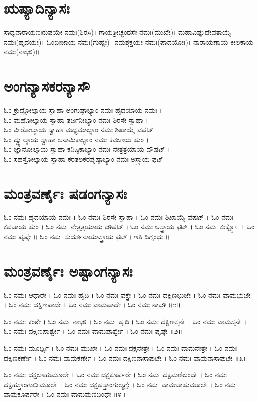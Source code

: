 \section{ಋಷ್ಯಾದಿನ್ಯಾಸಃ}
ಸಾಧ್ಯನಾರಾಯಣಋಷಯೇ ನಮಃ(ಶಿರಸಿ)। ಗಾಯತ್ರೀಚ್ಛಂದಸೇ ನಮಃ(ಮುಖೇ)। ಮಹಾವಿಷ್ಣುದೇವತಾಯೈ ನಮಃ(ಹೃದಯೇ)। ಓಂಬೀಜಾಯ ನಮಃ(ಗುಹ್ಯೇ)। ನಮಶ್ಶಕ್ತಯೇ ನಮಃ(ಪಾದಯೋಃ)। ನಾರಾಯಣಾಯ ಕೀಲಕಾಯ ನಮಃ(ನಾಭೌ)॥
\section{ಅಂಗನ್ಯಾಸಕರನ್ಯಾಸೌ}
ಓಂ ಕ್ರುದ್ಧೋಲ್ಕಾಯ ಸ್ವಾಹಾ ಅಂಗುಷ್ಠಾಭ್ಯಾಂ ನಮಃ ಹೃದಯಾಯ ನಮಃ ।\\
ಓಂ ಮಹೋಲ್ಕಾಯ ಸ್ವಾಹಾ ತರ್ಜನೀಭ್ಯಾಂ ನಮಃ ಶಿರಸೇ ಸ್ವಾಹಾ ।\\
ಓಂ ವೀರೋಲ್ಕಾಯ ಸ್ವಾಹಾ ಮಧ್ಯಮಾಭ್ಯಾಂ ನಮಃ ಶಿಖಾಯೈ ವಷಟ್ ।\\
ಓಂ ದ್ವ್ಯುಲ್ಕಾಯ ಸ್ವಾಹಾ ಅನಾಮಿಕಾಭ್ಯಾಂ ನಮಃ ಕವಚಾಯ ಹುಂ ।\\
ಓಂ ಜ್ಞಾನೋಲ್ಕಾಯ ಸ್ವಾಹಾ ಕನಿಷ್ಠಿಕಾಭ್ಯಾಂ ನಮಃ ನೇತ್ರತ್ರಯಾಯ ವೌಷಟ್ ।\\
ಓಂ ಸಹಸ್ರೋಲ್ಕಾಯ ಸ್ವಾಹಾ ಕರತಲಕರಪೃಷ್ಠಾಭ್ಯಾಂ ನಮಃ ಅಸ್ತ್ರಾಯ ಫಟ್ ।
\section{ಮಂತ್ರವರ್ಣೈಃ ಷಡಂಗನ್ಯಾಸಃ}
ಓಂ  ನಮಃ ಹೃದಯಾಯ ನಮಃ । ಓಂ  ನಮಃ ಶಿರಸೇ ಸ್ವಾಹಾ । ಓಂ  ನಮಃ ಶಿಖಾಯೈ ವಷಟ್ । ಓಂ  ನಮಃ ಕವಚಾಯ ಹುಂ । ಓಂ  ನಮಃ ನೇತ್ರತ್ರಯಾಯ ವೌಷಟ್ । ಓಂ  ನಮಃ ಅಸ್ತ್ರಾಯ ಫಟ್ । ಓಂ  ನಮಃ ಕುಕ್ಷ್ಯೋಃ । ಓಂ  ನಮಃ ಪೃಷ್ಠೇ ॥
ಓಂ ನಮಃ ಸುದರ್ಶನಾಯಾಸ್ತ್ರಾಯ ಫಟ್ । ಇತಿ ದಿಗ್ಬಂಧಃ ॥
 \section{ಮಂತ್ರವರ್ಣೈಃ ಅಷ್ಟಾಂಗನ್ಯಾಸಃ}
ಓಂ  ನಮಃ ಆಧಾರೇ । ಓಂ  ನಮಃ ಹೃದಿ । ಓಂ  ನಮಃ ವಕ್ತ್ರೇ । ಓಂ  ನಮಃ ದಕ್ಷಿಣಭುಜೇ । ಓಂ  ನಮಃ ವಾಮಭುಜೇ । ಓಂ  ನಮಃ ದಕ್ಷಿಣಪಾದೇ । ಓಂ  ನಮಃ ವಾಮಪಾದೇ । ಓಂ  ನಮಃ ನಾಭೌ ॥೧॥

ಓಂ  ನಮಃ ಕಂಠೇ । ಓಂ  ನಮಃ ನಾಭೌ । ಓಂ  ನಮಃ ಹೃದಿ । ಓಂ  ನಮಃ ದಕ್ಷಿಣಸ್ತನೇ । ಓಂ  ನಮಃ ವಾಮಸ್ತನೇ । ಓಂ  ನಮಃ ದಕ್ಷಿಣಪಾರ್ಶ್ವೇ । ಓಂ  ನಮಃ ವಾಮಪಾರ್ಶ್ವೇ । ಓಂ  ನಮಃ ಪೃಷ್ಠೇ ॥೨॥

ಓಂ  ನಮಃ ಮೂರ್ಧ್ನಿ । ಓಂ  ನಮಃ ಮುಖೇ । ಓಂ  ನಮಃ ದಕ್ಷನೇತ್ರೇ । ಓಂ  ನಮಃ ವಾಮನೇತ್ರೇ । ಓಂ  ನಮಃ ದಕ್ಷಿಣಕರ್ಣೇ । ಓಂ  ನಮಃ ವಾಮಕರ್ಣೇ । ಓಂ  ನಮಃ ದಕ್ಷಿಣನಾಸಾಪುಟೇ । ಓಂ  ನಮಃ ವಾಮನಾಸಾಪುಟೇ ॥೩॥

ಓಂ  ನಮಃ ದಕ್ಷಬಾಹುಮೂಲೇ । ಓಂ  ನಮಃ ದಕ್ಷಕೂರ್ಪರೇ । ಓಂ  ನಮಃ ದಕ್ಷಮಣಿಬಂಧೇ । ಓಂ  ನಮಃ ದಕ್ಷಹಸ್ತಾಂಗುಲೀಮೂಲೇ । ಓಂ  ನಮಃ ದಕ್ಷಹಸ್ತಾಂಗುಲ್ಯಗ್ರೇ । ಓಂ  ನಮಃ ವಾಮಬಾಹುಮೂಲೇ । ಓಂ  ನಮಃ ವಾಮಕೂರ್ಪರೇ । ಓಂ  ನಮಃ ವಾಮಮಣಿಬಂಧೇ ॥೪॥

